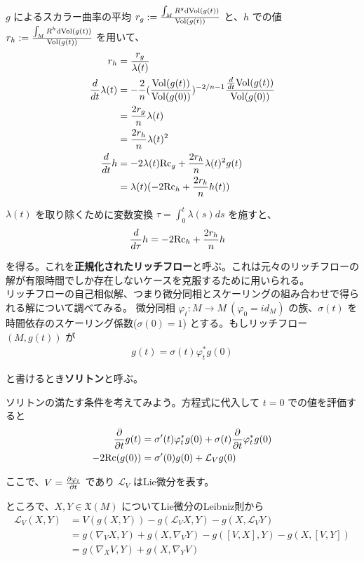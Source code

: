 \documentclass[dvipdfmx,a4paper]{jsreport}
\theoremstyle{definition}
\renewcommand{\L}{\mathcal{L}}
\newcommand{\der}{\partial}
\newcommand{\Vol}{{\rm Vol}}
\newcommand{\dVol}{{\rm dVol}}
\newcommand{\Rc}{{\rm Rc}}
\renewcommand{\phi}{\varphi}
\begin{document}
$g$ によるスカラー曲率の平均 $r_g:={\int_M R^g \dVol(g(t)) \over \Vol(g(t))}$ と、$h$ での値 $r_h:={\int_M R^h \dVol(g(t)) \over \Vol(g(t))}$ を用いて、
\begin{align*}
    r_h &= {r_g \over \lambda(t)} \\
    {d \over dt}\lambda(t) &= -{2 \over n}({\Vol(g(t)) \over \Vol(g(0))})^{-2/n-1}{{d \over dt} \Vol(g(t)) \over \Vol(g(0))} \\
    &= {2r_g \over n}\lambda(t) \\
    &= {2r_h \over n}\lambda(t)^2 \\
    {d \over dt}h &= -2\lambda(t)\Rc_g+{2r_h \over n}\lambda(t)^2g(t) \\
    &= \lambda(t)(-2\Rc_h+{2r_h \over n}h(t)) \\
\end{align*}

$\lambda(t)$ を取り除くために変数変換 $\tau=\int_{0}^t \lambda(s)ds$ を施すと、
\begin{align*}
    {d \over d\tau}h &= -2\Rc_h+{2r_h \over n}h
\end{align*}

を得る。これを\textbf{正規化されたリッチフロー}と呼ぶ。これは元々のリッチフローの解が有限時間でしか存在しないケースを克服するために用いられる。 \\

リッチフローの自己相似解、つまり微分同相とスケーリングの組み合わせで得られる解について調べてみる。
 微分同相 $\phi_t:M \to M\ (\phi_0=id_M)$ の族、$\sigma(t)$ を時間依存のスケーリング係数($\sigma(0)=1$) とする。もしリッチフロー $(M,g(t))$ が
\begin{align*}
    g(t)=\sigma(t)\phi_t^*g(0)
\end{align*}

と書けるとき\textbf{ソリトン}と呼ぶ。

ソリトンの満たす条件を考えてみよう。方程式に代入して $t=0$ での値を評価すると
\begin{align*}
    {\der \over \der t}g(t) &= \sigma'(t)\phi_t^*g(0)+\sigma(t){\der \over \der t}\phi_t^*g(0) \\
    -2\Rc(g(0)) &= \sigma'(0)g(0)+\L_V g(0)
\end{align*}

ここで、$V={\der \phi_t \over \der t}$ であり $\L_V$ はLie微分を表す。

ところで、$X,Y \in \mathfrak{X}(M)$ についてLie微分のLeibniz則から
\begin{align*}
    \L_V(X,Y) &= V(g(X,Y))-g(\L_V X,Y)-g(X,\L_V Y) \\
    &= g(\nabla_V X,Y)+g(X,\nabla_V Y)-g([V,X],Y)-g(X,[V,Y]) \\
    &= g(\nabla_X V,Y)+g(X,\nabla_Y V)
\end{align*}
\end{document}
